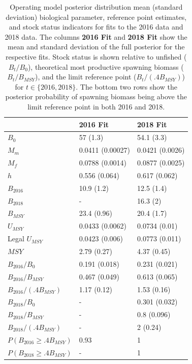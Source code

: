 \documentclass[11pt]{book}
\begin{document}
\begingroup\fontsize{12}{14}\selectfont
\begingroup\fontsize{12}{14}\selectfont
\begin{longtable}[t]{lll}
\caption{\label{tab:unnamed-chunk-5}Operating model posterior distribution mean (standard deviation) biological parameter, 
reference point estimates, and stock status indicators for fits to the 2016 data 
and 2018 data. The columns \textbf{2016 Fit} and \textbf{2018 Fit} show the mean 
and standard deviation of the full posterior for the respective fits. Stock status is shown relative to 
unfished ($B_t/B_0$), theoretical
most productive spawning biomass ($B_t/B_{MSY}$), and the limit reference point 
($B_t/(.4B_{MSY})$) for $t \in \{2016, 2018\}$. The bottom
two rows show the posterior probability of spawning biomass 
being above the limit reference point in both 2016 and 2018.}\\
\toprule
\textbf{ } & \textbf{2016 Fit} & \textbf{2018 Fit}\\
\midrule
$B_0$ & 57 (1.3) & 54.1 (3.3)\\
$M_m$ & 0.0411 (0.00027) & 0.0421 (0.0026)\\
$M_f$ & 0.0788 (0.0014) & 0.0877 (0.0025)\\
$h$ & 0.556 (0.064) & 0.617 (0.062)\\
$B_{2016}$ & 10.9 (1.2) & 12.5 (1.4)\\
$B_{2018}$ & - & 16.3 (2)\\
$B_{MSY}$ & 23.4 (0.96) & 20.4 (1.7)\\
$U_{MSY}$ & 0.0433 (0.0062) & 0.0734 (0.01)\\
Legal $U_{MSY}$ & 0.0423 (0.006) & 0.0773 (0.011)\\
$MSY$ & 2.79 (0.27) & 4.37 (0.45)\\
$B_{2016}/B_0$ & 0.191 (0.018) & 0.231 (0.021)\\
$B_{2016}/B_{MSY}$ & 0.467 (0.049) & 0.613 (0.065)\\
$B_{2016}/(.4B_{MSY})$ & 1.17 (0.12) & 1.53 (0.16)\\
$B_{2018}/B_0$ & - & 0.301 (0.032)\\
$B_{2018}/B_{MSY}$ & - & 0.8 (0.096)\\
$B_{2018}/(.4B_{MSY})$ & - & 2 (0.24)\\
$P(B_{2016} \geq .4B_{MSY})$ & 0.93 & 1\\
$P(B_{2018} \geq .4B_{MSY})$ & - & 1\\
\bottomrule
\end{longtable}
\endgroup{}
\endgroup{}

\newpage
\end{document}
